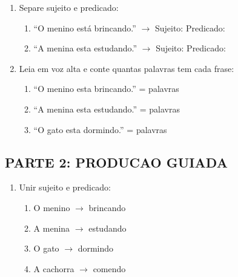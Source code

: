 \begin{exercicio}
\begin{enumerate}
  \item Separe sujeito e predicado:
  \begin{enumerate}[label=\alph*)]
    \item ``O menino est\'a brincando.'' $\rightarrow$ Sujeito: \underline{\hspace{3cm}} Predicado: \underline{\hspace{3cm}}
    \item ``A menina esta estudando.'' $\rightarrow$ Sujeito: \underline{\hspace{3cm}} Predicado: \underline{\hspace{3cm}}
  \end{enumerate}

  \item Leia em voz alta e conte quantas palavras tem cada frase:
  \begin{enumerate}[label=\alph*)]
    \item ``O menino esta brincando.'' = \underline{\hspace{0.5cm}} palavras
    \item ``A menina esta estudando.'' = \underline{\hspace{0.5cm}} palavras
    \item ``O gato esta dormindo.'' = \underline{\hspace{0.5cm}} palavras
  \end{enumerate}
\end{enumerate}

\subsection*{PARTE 2: PRODUCAO GUIADA}

\begin{enumerate}[resume]
  \item Unir sujeito e predicado:
  \begin{enumerate}[label=\alph*)]
    \item O menino $\rightarrow$ \underline{\hspace{4cm}} brincando
    \item A menina $\rightarrow$ \underline{\hspace{4cm}} estudando
    \item O gato $\rightarrow$ \underline{\hspace{4cm}} dormindo
    \item A cachorra $\rightarrow$ \underline{\hspace{4cm}} comendo
  \end{enumerate}


\end{enumerate}
\end{exercicio}
